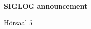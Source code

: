 \documentclass[a4paper]{article}
\begin{document}
\printGenericVSLHeader
\begin{center}
\begin{vsltext}{2.5cm}{4cm}

   \vspace{0.5cm} 

    \textbf{SIGLOG announcement} 

    \vspace{1.5cm}

    Hörsaal 5 

\end{vsltext}

\end{center}
\end{document}

